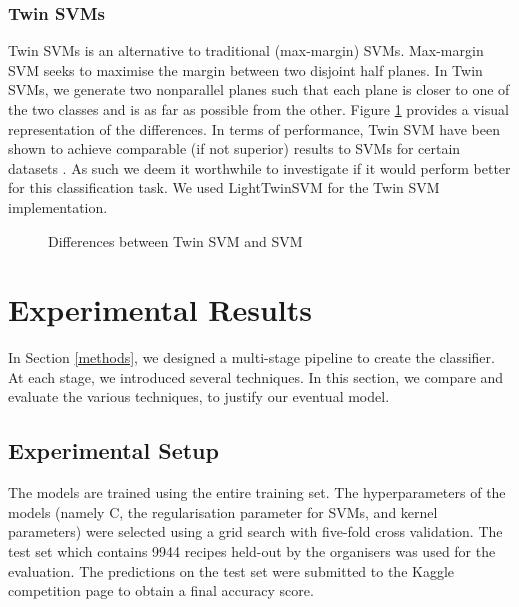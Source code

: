 \documentclass{article}
\def\light#1{{\color{light}#1}}
\begin{document}
\subsubsection*{Twin SVMs}
Twin SVMs \cite{TSVM} is an alternative to traditional (max-margin) SVMs. Max-margin SVM seeks to maximise the margin between two disjoint half planes. In Twin SVMs, we generate two nonparallel planes such that each plane is closer to one of the two classes and is as far as possible from the other. Figure \ref{fig:tsvm} provides a visual representation of the differences. In terms of performance, Twin SVM have been shown to achieve comparable (if not superior) results to SVMs for certain datasets \cite{TSVM, LTSVM}. As such we deem it worthwhile to investigate if it would perform better for this classification task. We used \light{LightTwinSVM \cite{LTSVM}} for the Twin SVM implementation.

\begin{figure}%
    \centering
    \qquad
    \caption{ Differences between Twin SVM and SVM \cite{LTSVM}}%
    \label{fig:tsvm}%
\end{figure}


\section{Experimental Results} \label{experiments}
In Section \ref{methods}, we designed a multi-stage pipeline to create the classifier. At each stage, we introduced several techniques. In this section, we compare and evaluate the various techniques, to justify our eventual model.

\subsection{Experimental Setup}
The models are trained using the entire training set. The hyperparameters of the models (namely C, the regularisation parameter for SVMs, and kernel parameters) were selected using a grid search with five-fold cross validation. The test set which contains 9944 recipes held-out by the organisers was used for the evaluation. The predictions on the test set were submitted to the Kaggle competition page to obtain a final accuracy score. 
\end{document}
